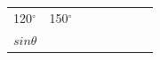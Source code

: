 \begin{center}
\begin{xtabular*}{\mytablewidth}[t]{|p{10\mystarwidth}|p{10\mystarwidth}|p{10\mystarwidth}|p{10\mystarwidth}|p{10\mystarwidth}|p{10\mystarwidth}|p{10\mystarwidth}|p{10\mystarwidth}|}
    
        120\begin{math}{}^{\circ }\end{math} &
    
    
        150\begin{math}{}^{\circ }\end{math} &
    
    
     \tabularnewline{}
    
    
        
                  \begin{math}sin\theta \end{math}
                 &
    
    
         &
    
    
         &
    
    
         &
    

\end{xtabular*}
\end{center}
